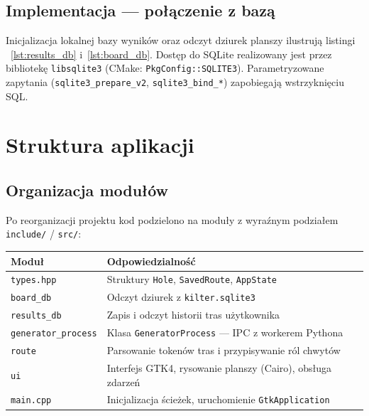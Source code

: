 \documentclass[fleqn,onecolumn,a4paper,12pt,titlepage]{article}
\begin{document}
\subsection*{Implementacja --- połączenie z bazą}

Inicjalizacja lokalnej bazy wyników oraz odczyt dziurek planszy ilustrują listingi
~\ref{lst:results_db} i~\ref{lst:board_db}. Dostęp do SQLite realizowany jest przez
bibliotekę \texttt{libsqlite3} (CMake: \texttt{PkgConfig::SQLITE3}). Parametryzowane
zapytania (\texttt{sqlite3\_prepare\_v2}, \texttt{sqlite3\_bind\_*}) zapobiegają
wstrzyknięciu SQL.





\newpage

\section*{Struktura aplikacji}

\subsection*{Organizacja modułów}

Po reorganizacji projektu kod podzielono na moduły z wyraźnym podziałem
\texttt{include/} / \texttt{src/}:

\begin{center}
\small
\begin{tabular}{l|l}
\textbf{Moduł} & \textbf{Odpowiedzialność} \\
\hline
\texttt{types.hpp} & Struktury \texttt{Hole}, \texttt{SavedRoute}, \texttt{AppState} \\
\texttt{board\_db} & Odczyt dziurek z \texttt{kilter.sqlite3} \\
\texttt{results\_db} & Zapis i odczyt historii tras użytkownika \\
\texttt{generator\_process} & Klasa \texttt{GeneratorProcess} --- IPC z workerem Pythona \\
\texttt{route} & Parsowanie tokenów tras i przypisywanie ról chwytów \\
\texttt{ui} & Interfejs GTK4, rysowanie planszy (Cairo), obsługa zdarzeń \\
\texttt{main.cpp} & Inicjalizacja ścieżek, uruchomienie \texttt{GtkApplication} \\
\end{tabular}
\end{center}
\end{document}
